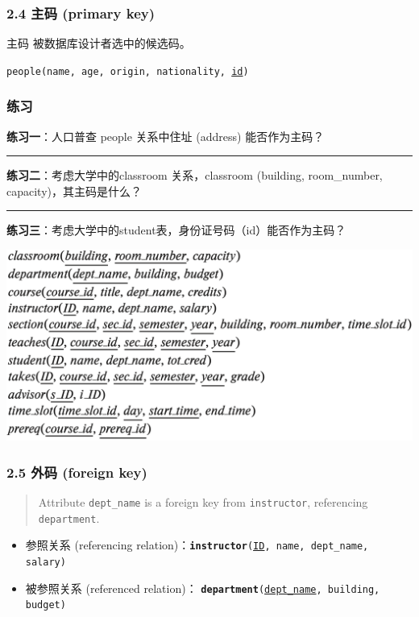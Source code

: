 \documentclass[aspectratio=169, 14pt]{beamer}
\begin{document}
\begin{frame}
    \frametitle{2.4 主码 (primary key)}
\begin{exampleblock}{主码}
    被数据库设计者选中的候选码。
\end{exampleblock}
    
\texttt{people(name, age, origin, nationality, \underline{id})}

\end{frame}

\begin{frame}
    \frametitle{练习 {\large {}}}
\textbf{练习一}：人口普查 people 关系中住址 (address) 能否作为主码？    
\pause
\noindent\rule{\textwidth}{1pt}
\textbf{练习二}：考虑大学中的classroom 关系，classroom (building, room\_number, capacity)，其主码是什么？
\pause
\noindent\rule{\textwidth}{1pt}
\textbf{练习三}：考虑大学中的student表，身份证号码（id）能否作为主码？
\end{frame}

\begin{frame}
\begin{center}
    \includegraphics[height=.75\paperheight]{table/schema}
\end{center} 

\end{frame}

\begin{frame}
    \frametitle{2.5 外码 (foreign key)}

    \begin{quote}
        Attribute \texttt{dept\_name} is a \alert{foreign key} from \texttt{instructor}, referencing \texttt{department}.
    \end{quote}


    \begin{itemize}
        \item \alert{参照关系} (referencing relation)：\texttt{\textbf{instructor}(\underline{ID}, name, dept\_name, salary)}
        \item  \alert{被参照关系} (referenced relation)：
        \texttt{\textbf{department}(\underline{dept\_name}, building, budget)}
    \end{itemize}

\pause
\end{frame}
\end{document}
